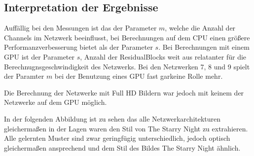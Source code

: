 \subsection{Interpretation der Ergebnisse}

Auffällig bei den Messungen ist das der Parameter $ m $, welche die Anzahl der Channels im Netzwerk beeinflusst, bei Berechnungen auf dem CPU einen größere Performanzverbesserung bietet als der Parameter $ s $. Bei Berechnungen mit einem GPU ist der Parameter $ s $, Anzahl der ResidualBlocks weit aus relatanter für die Berechnugnsgeschwindigkeit des Netzwerks. Bei den Netzwerken 7, 8 und 9 spielt der Paramter $ m $ bei der Benutzung eines GPU fast garkeine Rolle mehr.

Die Berechnung der Netzwerke mit Full HD Bildern war jedoch mit keinem der Netzwerke auf dem GPU möglich.

In der folgenden Abbildung ist zu sehen das alle Netzwerkarchitekturen gleichermaßen in der Lagen waren den Stil von The Starry Night zu extrahieren.
Alle gelernten Muster sind zwar geringfügig unterschiedlich, jedoch optisch gleichermaßen ansprechend und dem Stil des Bildes The Starry Night ähnlich.

